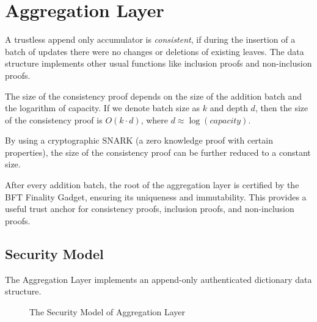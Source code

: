 \documentclass[twocolumn]{article}
\begin{document}
\section{Aggregation Layer}

A trustless append only accumulator is \emph{consistent}, if during the insertion of a batch of updates there were no changes or deletions of existing leaves. The data structure implements other usual functions like inclusion proofs and non-inclusion proofs.

The size of the consistency proof depends on the size of the addition batch and the logarithm of capacity. If we denote batch size as $k$ and depth $d$, then the size of the consistency proof is $O(k \cdot d)$, where $d \approx \log(capacity)$.

By using a cryptographic SNARK (a zero knowledge proof with certain properties), the size of the consistency proof can be further reduced to a constant size.

After every addition batch, the root of the aggregation layer is certified by the BFT Finality Gadget, ensuring its uniqueness and immutability. This provides a useful trust anchor for consistency proofs, inclusion proofs, and non-inclusion proofs.


\subsection{Security Model}

The Aggregation Layer implements an append-only authenticated dictionary data structure.

\begin{figure}[!htbp]
    \centering
{}
    \caption{The Security Model of Aggregation Layer}\label{fig:model}
\end{figure}
\end{document}
